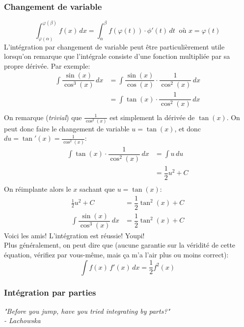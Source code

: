 \documentclass{article}
\begin{document}
\subsubsection{Changement de variable}
\begin{equation}
	\boxed{ \int_{\varphi(\alpha)}^{\varphi(\beta)} f(x) \, dx = \int_\alpha^\beta f(\varphi(t)) \cdot \phi'(t) \, dt } \: \text{ où } x= \varphi(t)
\end{equation}
L'intégration par changement de variable peut être particulièrement utile lorsqu'on remarque que l'intégrale consiste d'une fonction multipliée par sa propre dérivée. Par exemple: 
\begin{align*}
	\int \dfrac{\sin(x)}{\cos^3(x)} \, dx 	&= \int \dfrac{\sin(x)}{\cos(x)} \cdot \dfrac{1}{\cos^2(x)} \, dx \\
												&= \int \tan(x) \cdot \dfrac{1}{\cos^2(x)} \, dx \\
\end{align*}
On remarque (\emph{trivial}) que \(\frac{1}{\cos^2(x)}\) est simplement la dérivée de \(\tan(x)\). On peut donc faire le changement de variable \(u = \tan(x)\), et donc \(du = \tan'(x) = \frac{1}{\cos^2(x)}\):
\begin{align*}
	\int \tan(x) \cdot \dfrac{1}{\cos^2(x)} \, dx 	&= \int u \, du \\
															&= \dfrac{1}{2}u^2 + C \\
\end{align*}
On réimplante alors le \(x\) sachant que \(u = \tan(x)\):
\begin{align*}
	\frac{1}{2}u^2 + C &= \dfrac{1}{2}\tan^2(x) + C \\
	\int \dfrac{\sin(x)}{\cos^3(x)} \, dx &= \dfrac{1}{2}\tan^2(x) + C
\end{align*}
Voici les amis! L'intégration est réussie! Youpi! \\
Plus généralement, on peut dire que (aucune garantie sur la véridité de cette équation, vérifiez par vous-même, mais ça m'a l'air plus ou moins correct):
\begin{equation*}
	\int f(x) \, f'(x) \, dx = \dfrac{1}{2}f^2(x)
\end{equation*}

\subsubsection{Intégration par parties}
\begin{center}
	\emph{"Before you jump, have you tried integrating by parts?" \\ \qquad \qquad - Lachowska}
\end{center}
\end{document}
